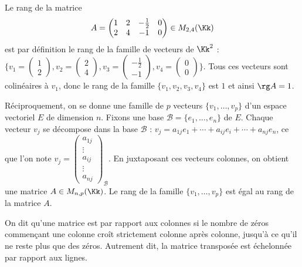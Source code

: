 \documentclass[class=report,crop=false]{standalone}
\begin{document}
\begin{exemple}
Le rang de la matrice
$$A = \begin{pmatrix}
  1 & 2 & -\frac12 & 0 \\
  2 & 4 & -1       & 0
  \end{pmatrix} \in M_{2,4}(\Kk)$$
est par définition le rang de la famille de vecteurs de $\Kk^2$ :
$\bigg\{
v_1 = \left(\begin{smallmatrix}1 \\ 2  \end{smallmatrix}\right),
v_2 = \left(\begin{smallmatrix}2 \\ 4  \end{smallmatrix}\right),
v_3 = \left(\begin{smallmatrix}-\frac 12 \\ -1  \end{smallmatrix}\right),
v_4 = \left(\begin{smallmatrix}0 \\ 0  \end{smallmatrix}\right)
\bigg\}$. Tous ces vecteurs sont colinéaires à $v_1$, donc
le rang de la famille $\{ v_1, v_2, v_3, v_4 \}$ est $1$ et ainsi
$\rg A = 1$.
\end{exemple}


Réciproquement, on se donne une famille de $p$ vecteurs
$\{ v_1, \ldots, v_p \}$ d'un espace vectoriel $E$ de dimension $n$.
Fixons une base $\mathcal{B} = \{ e_1,\ldots,e_n\}$ de $E$.
Chaque vecteur $v_j$ se décompose dans la base $\mathcal{B}$ :
$v_j = a_{1j} e_1 + \cdots + a_{ij} e_i + \cdots + a_{nj}e_n$,
ce que l'on note
$v_j = \left(\begin{smallmatrix} a_{1j} \\ \vdots \\ a_{ij} \\ \vdots \\ a_{nj}
\end{smallmatrix}\right)_{\!\!\mathcal{B}}$.
En juxtaposant ces vecteurs colonnes, on obtient une matrice
$A \in M_{n,p}(\Kk)$.
Le rang de la famille $\{ v_1, \ldots, v_p \}$ est égal au rang de la matrice $A$.

\begin{definition}
On dit qu'une matrice est  par rapport aux colonnes si
le nombre de zéros commençant une colonne croît strictement colonne après colonne,
jusqu'à ce qu'il ne reste plus que des zéros.
Autrement dit, la matrice transposée est échelonnée par rapport aux lignes.
\end{definition}
\end{document}
